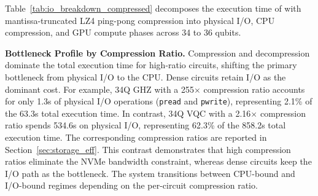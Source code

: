 \begin{table}[t]
\centering
\caption{I/O breakdown (seconds) for \EdgeQuantum with mantissa-truncated LZ4 ping-pong compression across 34-36 qubits.}
\vspace{-.2cm}

\setlength{\tabcolsep}{3pt}
\scriptsize
{}
\label{tab:io_breakdown_compressed}
\end{table}



Table~\ref{tab:io_breakdown_compressed} decomposes the execution time of \EdgeQuantum with mantissa-truncated LZ4 ping-pong compression into physical I/O, CPU compression, and GPU compute phases across 34 to 36 qubits.

\noindent\textbf{Bottleneck Profile by Compression Ratio. }Compression and decompression dominate the total execution time for high-ratio circuits, shifting the primary bottleneck from physical I/O to the CPU. Dense circuits retain I/O as the dominant cost. For example, 34Q GHZ with a 255$\times$ compression ratio accounts for only 1.3s of physical I/O operations (\texttt{pread} and \texttt{pwrite}), representing 2.1\% of the 63.3s total execution time. In contrast, 34Q VQC with a 2.16$\times$ compression ratio spends 534.6s on physical I/O, representing 62.3\% of the 858.2s total execution time. The corresponding compression ratios are reported in Section~\ref{sec:storage_eff}. This contrast demonstrates that high compression ratios eliminate the NVMe bandwidth constraint, whereas dense circuits keep the I/O path as the bottleneck. The system transitions between CPU-bound and I/O-bound regimes depending on the per-circuit compression ratio.



